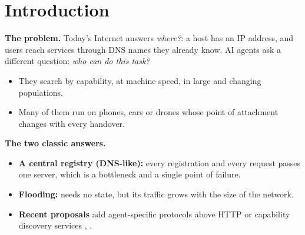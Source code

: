\documentclass[journal]{IEEEtran}
\begin{document}
\begin{abstract}
\begin{itemize}
\item \textbf{Learning helps, modestly.} The DQN delivers 62.9\% of the requests (matching ceiling 69.3\%). That is 2.5 points more than greedy forwarding on the same table (95\% CI 1.4--3.7) and 3.5 points more than the load-aware heuristic. On requests that both methods deliver, the delay differs by about 0.5 ms.
\item \textbf{It does not beat everything.} An SPFR-style rule with an exact table delivers 1.2 points more (CI 0.2--2.2) with 3.6 times the control bytes. Flooding delivers 2.5 points more, but needs 234 ms and 174 kB per request. A central registry has the same success as the DQN and one eleventh of its control traffic, but takes 60 ms instead of 21 ms and is a single point of failure.
\item \textbf{The matching limits everything.} Six pre-trained encoders reach only 73--77\% top-1 accuracy on unseen paraphrases, and the choice of the acceptance threshold moves success far more than any routing change.
\item \textbf{A realistic radio lowers every method.} With a distance-dependent radio computed with Sionna, success falls by 8 to 21 points. The registries, which cross the radio four times, fall the most, and the DQN keeps its lead over greedy (Section 5.13).
\end{itemize}

\end{abstract}

\IEEEpeerreviewmaketitle

\section{Introduction}
\textbf{The problem.} Today's Internet answers \emph{where?}: a host has an IP address, and users reach services through DNS names they already know. AI agents ask a different question: \emph{who can do this task?}

\begin{itemize}
\item They search by capability, at machine speed, in large and changing populations.
\item Many of them run on phones, cars or drones whose point of attachment changes with every handover.
\end{itemize}

\textbf{The two classic answers.}

\begin{itemize}
\item \textbf{A central registry (DNS-like):} every registration and every request passes one server, which is a bottleneck and a single point of failure.
\item \textbf{Flooding:} needs no state, but its traffic grows with the size of the network.
\item \textbf{Recent proposals} add agent-specific protocols above HTTP \cite{ref1} or capability discovery services \cite{ref3}, \cite{ref4}.
\end{itemize}
\end{document}
